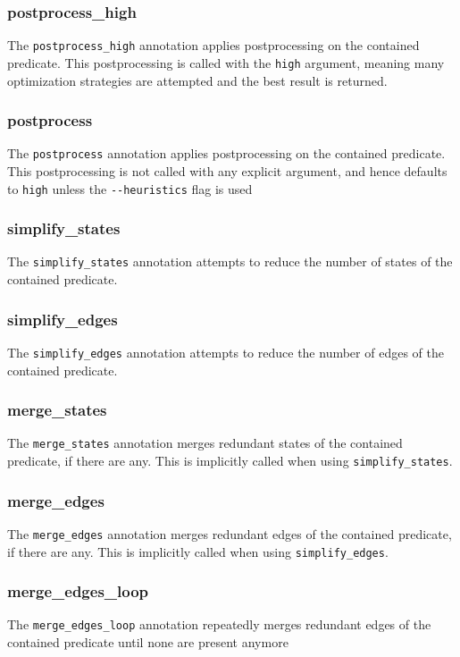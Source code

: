 \documentclass{report}
\begin{document}
\subsubsection{postprocess\_high}
The \verb+postprocess_high+ annotation applies postprocessing on the contained predicate.
This postprocessing is called with the \verb+high+ argument, meaning many optimization strategies are attempted and the best result is returned.

\subsubsection{postprocess}
The \verb+postprocess+ annotation applies postprocessing on the contained predicate.
This postprocessing is not called with any explicit argument, and hence defaults to \verb+high+ unless the \verb+--heuristics+ flag is used

\subsubsection{simplify\_states}
The \verb+simplify_states+ annotation attempts to reduce the number of states of the contained predicate.

\subsubsection{simplify\_edges}
The \verb+simplify_edges+ annotation attempts to reduce the number of edges of the contained predicate.

\subsubsection{merge\_states}
The \verb+merge_states+ annotation merges redundant states of the contained predicate, if there are any.
This is implicitly called when using \verb+simplify_states+.

\subsubsection{merge\_edges}
The \verb+merge_edges+ annotation merges redundant edges of the contained predicate, if there are any.
This is implicitly called when using \verb+simplify_edges+.

\subsubsection{merge\_edges\_loop}
The \verb+merge_edges_loop+ annotation repeatedly merges redundant edges of the contained predicate until none are present anymore
\end{document}
